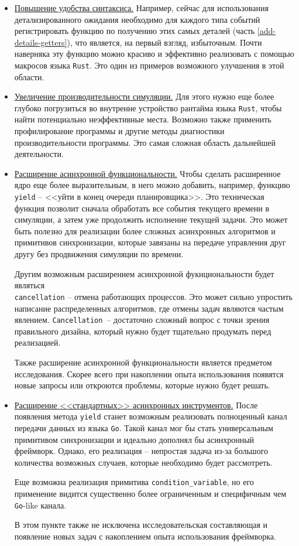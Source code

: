 \begin{itemize}
    \item \underline{Повышение удобства синтаксиса.} Например, сейчас для использования детализированного ожидания необходимо для каждого типа событий регистрировать функцию по получению этих самых деталей (часть \ref{add-details-getters}), что является, на первый взгляд, избыточным. Почти наверняка эту функцию можно красиво и эффективно реализовать с помощью макросов языка \texttt{Rust}. Это один из примеров возможного улучшения в этой области. 
    \item \underline{Увеличение производительности симуляции.} Для этого нужно еще более глубоко погрузиться во внутренне устройство рантайма языка \texttt{Rust}, чтобы найти потенциально неэффективные места. Возможно также применить профилирование программы и другие методы диагностики производительности программы. Это самая сложная область дальнейшей деятельности. 
    \item \underline{Расширение асинхронной функциональности.} Чтобы сделать расширенное ядро еще более выразительным, в него можно добавить, например, функцию \texttt{yield} -- <<уйти в конец очереди планировщика>>. Это техническая функция позволит сначала обработать все события текущего времени в симуляции, а затем уже продолжить исполнение текущей задачи. Это может быть полезно для реализации более сложных асинхронных алгоритмов и примитивов синхронизации, которые завязаны на передаче управления друг другу без продвижения симуляции по времени. 
    
    Другим возможным расширением асинхронной фукнциональности будет являться \\ \texttt{cancellation} -- отмена работающих процессов. Это может сильно упростить написание распределенных алгоритмов, где отмены задач являются частым явлением. \texttt{Cancellation}~-- достаточно сложный вопрос с точки зрения правильного дизайна, который нужно будет тщательно продумать перед реализацией.
    
    Также расширение асинхронной функциональности является предметом исследования. Скорее всего при накоплении опыта использования появятся новые запросы или откроются проблемы, которые нужно будет решать.
    \item \underline{Расширение <<стандартных>> асинхронных инструментов.} После появления метода \texttt{yield} станет возможным реализовать полноценный канал передачи данных из языка \texttt{Go}. Такой канал мог бы стать универсальным примитивом синхронизации и  идеально дополнял бы асинхронный фреймворк. Однако, его реализация -- непростая задача из-за большого количества возможных случаев, которые необходимо будет рассмотреть.  
    
    Еще возможна реализация примитива \texttt{condition\_variable}, но его применение видится существенно более ограниченным и специфичным чем \texttt{Go}-like канала.

    В этом пункте также не исключена исследовательская составляющая и появление новых задач с накоплением опыта использования фреймворка.
\end{itemize}


